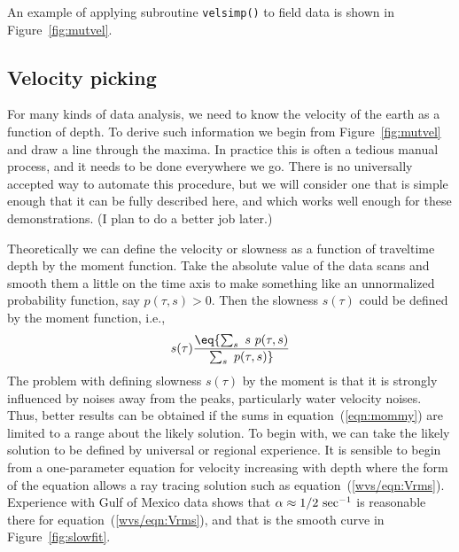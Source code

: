
\par
An example of applying subroutine \texttt{velsimp()} 
to field data is shown in Figure~\ref{fig:mutvel}.


\subsection{Velocity picking}
For many kinds of data analysis,
we need to know the velocity of the earth as a function of depth.
To derive such information
we begin from Figure~\ref{fig:mutvel}
and draw a line through the maxima.
In practice this is often a tedious manual process,
and it needs to be done everywhere we go.
There is no universally accepted way to automate
this procedure, but we will consider one
that is simple enough that it can be fully described here,
and which works well enough for these demonstrations.
(I plan to do a better job later.)

\par
Theoretically we can define the velocity or slowness
as a function of traveltime depth by the moment function.
Take the absolute value of the data scans and smooth
them a little on the time axis to make something like an unnormalized
probability function, say $p(\tau ,s)>0$.
Then the slowness $s(\tau )$ could be defined by the moment function, i.e.,
\begin{equation}
s(\tau ) \eq { \sum_s \ s\  p(\tau ,s) \over \sum_s \ p(\tau ,s) }
\label{eqn:mommy}
\end{equation}
The problem with defining slowness $s(\tau )$ by the moment is that it is 
strongly influenced by noises away from the peaks,
particularly water velocity noises.
Thus, better results can be obtained if the sums in equation~(\ref{eqn:mommy})
are limited to a range about the likely solution.
To begin with, we can take the likely solution to be defined
by universal or regional experience.
It is sensible to begin from a one-parameter equation
for velocity increasing with depth where the form of the equation
allows a ray tracing solution
such as equation~(\ref{wvs/eqn:Vrms}).
Experience with Gulf of Mexico data shows that
$\alpha\approx 1/2\  {\rm sec}^{-1}$ is reasonable there
for equation~(\ref{wvs/eqn:Vrms}),
and that is the smooth curve
in Figure~\ref{fig:slowfit}.


